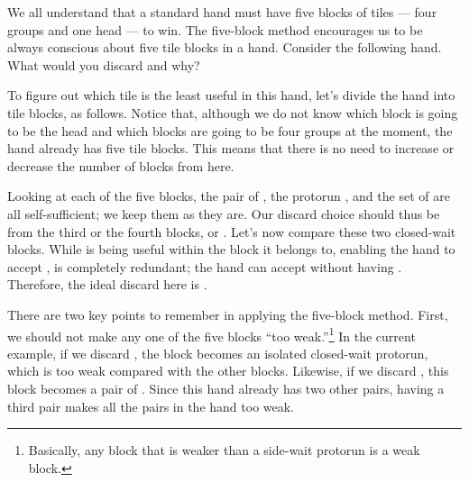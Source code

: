 We all understand that a standard hand
must have five blocks of tiles --- four groups and one head --- to win. 
The five-block method encourages us to be always conscious about five tile blocks in a hand. 
Consider the following hand. What would you discard and why?

\bp
{}\zhong\zhong\zhong
\ep

To figure out which tile is the least useful in this hand, let's divide the hand into tile blocks, as follows. 
\emj
Notice that, although we do not know which block is going to be the head and which blocks are going to be four groups at the moment, the hand already has five tile blocks. This means that there is no need to increase or decrease the number of blocks from here. 

\bigskip
Looking at each of the five blocks, the pair of {\LARGE{}}, the protorun {\LARGE{}}, and the set of {\LARGE\zhong} are all self-sufficient; we keep them as they are. Our discard choice should thus be from the third or the fourth blocks, {\LARGE{}} or {\LARGE{}}. 
Let's now compare these two closed-wait blocks. While {\LARGE{}} is being useful within the block it belongs to, enabling the hand to accept {\LARGE{}}, {\LARGE{}} is completely redundant; the hand can accept {\LARGE{}} without having {\LARGE{}}. Therefore, the ideal discard here is {\LARGE{}}. 

\bigskip
There are two key points to remember in applying the five-block method. 
First, we should not make any one of the five blocks ``too weak.''\footnote{Basically, any block that is weaker than a side-wait protorun is a weak block.} In the current example, if we discard {\LARGE{}}, the {\LARGE{}} block becomes an isolated closed-wait protorun, which is too weak compared with the other blocks. Likewise, if we discard {\LARGE{}}, this block becomes a pair of {\LARGE{}}. Since this hand already has two other pairs, having a third pair makes all the pairs in the hand too weak. 

